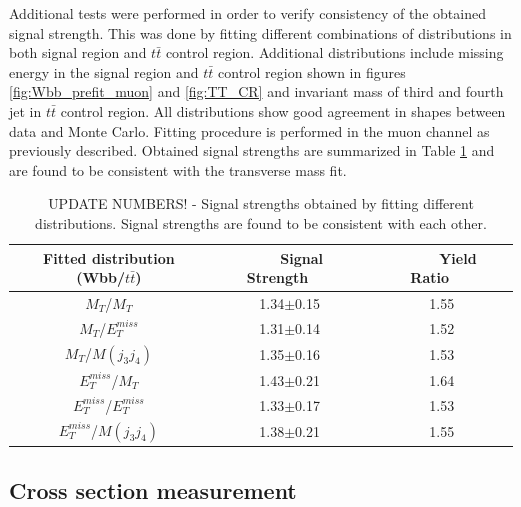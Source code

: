 Additional tests were performed in order to verify consistency of the obtained signal strength.
This was done by fitting different combinations of distributions in both signal region and $t\bar{t}$ control region.
Additional distributions include missing energy in the signal region and $t\bar{t}$ control region shown in figures \ref{fig:Wbb_prefit_muon} and \ref{fig:TT_CR} and invariant mass of third and fourth jet in $t\bar{t}$ control region. All distributions show good agreement
in shapes between data and Monte Carlo. Fitting procedure is performed in the muon channel as previously described.
Obtained signal strengths are summarized in Table \ref{tab:addFitTest} and are found to be consistent with the transverse mass fit.
\begin{table}[!htb]
\begin{center}
   \begin{tabular} {ccc} \hline\hline
   Fitted distribution (Wbb/$t\bar{t}$) & ~~~Signal Strength~~~ & ~~~~Yield Ratio~~~ \\
        \hline
        $M_T$/$M_T$                     &1.34$\pm$0.15  &1.55\\
        $M_T$/$E^{miss}_T$              &1.31$\pm$0.14  &1.52\\
        $M_T$/$M(j_3j_4)$               &1.35$\pm$0.16  &1.53\\
        $E^{miss}_T$/$M_T$              &1.43$\pm$0.21  &1.64\\
        $E^{miss}_T$/$E^{miss}_T$       &1.33$\pm$0.17  &1.53\\
        $E^{miss}_T$/$M(j_3j_4)$        &1.38$\pm$0.21  &1.55\\
   \hline\hline
   \end{tabular}
 \caption{UPDATE NUMBERS! - Signal strengths obtained by fitting different distributions. Signal strengths are found to be consistent with each other.}
\label{tab:addFitTest}
\end{center}
\end{table}

\subsection{Cross section measurement}

